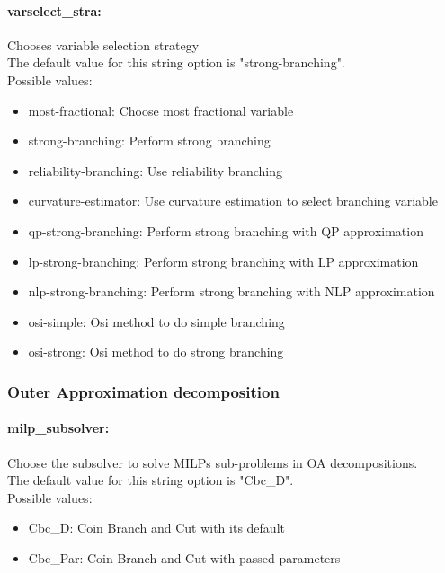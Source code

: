 \paragraph{varselect\_stra:} Chooses variable selection strategy\\
The default value for this string option is "strong-branching".
\\ 
Possible values:
\begin{itemize}
   \item most-fractional: Choose most fractional variable
   \item strong-branching: Perform strong branching
   \item reliability-branching: Use reliability branching
   \item curvature-estimator: Use curvature estimation to select branching
variable
   \item qp-strong-branching: Perform strong branching with QP approximation
   \item lp-strong-branching: Perform strong branching with LP approximation
   \item nlp-strong-branching: Perform strong branching with NLP approximation
   \item osi-simple: Osi method to do simple branching
   \item osi-strong: Osi method to do strong branching
\end{itemize}

\subsubsection{Outer Approximation decomposition}
\label{sec:bonmin_options_:_Options_for_MILP_subsolver_in_OA_decomposition}
\label{sec:bonmin_options_:_Options_for_OA_decomposition}

\paragraph{milp\_subsolver:} Choose the subsolver to solve MILPs sub-problems in OA decompositions. $\;$ \\
The default value for this string option is "Cbc\_D".
\\ 
Possible values:
\begin{itemize}
   \item Cbc\_D: Coin Branch and Cut with its default
   \item Cbc\_Par: Coin Branch and Cut with passed parameters
\end{itemize}

